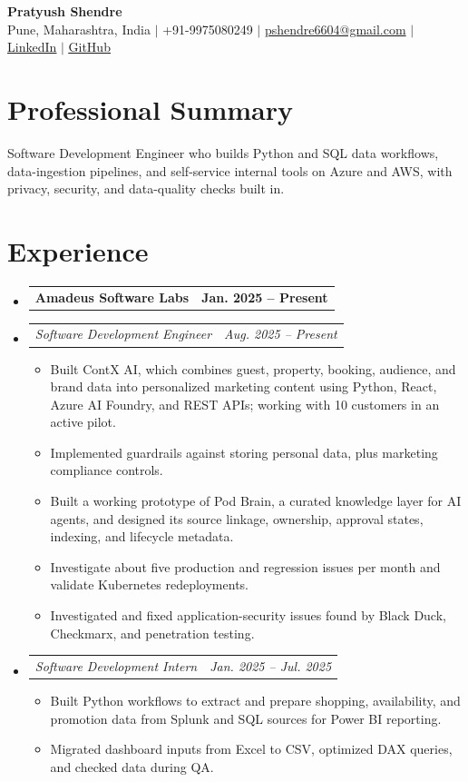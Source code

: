 \documentclass[a4paper,11pt]{article}
\makeatletter
\newcommand{\bulletpoint}[1]{\item\small{#1}}
\newcommand{\company}[2]{\item\begin{tabularx}{\textwidth}{@{}Xr@{}}\textbf{#1}& \textbf{#2}\end{tabularx}\vspace{-4pt}}
\newcommand{\role}[2]{\item\begin{tabularx}{\textwidth}{@{}Xr@{}}\textit{\small #1}&\textit{\small #2}\end{tabularx}\vspace{-5pt}}
\makeatother
\begin{document}
\begin{center}
  {\Large\bfseries Pratyush Shendre}\\[2pt]
  \small Pune, Maharashtra, India $|$ +91-9975080249 $|$
  \href{mailto:pshendre6604@gmail.com}{pshendre6604@gmail.com} $|$
  \href{https://www.linkedin.com/in/pratyush-shendre-2256a7223/}{\underline{LinkedIn}} $|$
  \href{https://github.com/PratyushS04}{\underline{GitHub}}
\end{center}

\section{Professional Summary}
\small Software Development Engineer who builds Python and SQL data workf{}lows, data-ingestion pipelines, and self-service internal tools on Azure and AWS, with privacy, security, and data-quality checks built in.

\section{Experience}
\begin{itemize}[leftmargin=0in,label={}]
  \company{Amadeus Software Labs}{Jan. 2025 -- Present}
  \role{Software Development Engineer}{Aug. 2025 -- Present}
  \begin{itemize}
    \bulletpoint{Built ContX AI, which combines guest, property, booking, audience, and brand data into personalized marketing content using Python, React, Azure AI Foundry, and REST APIs; working with 10 customers in an active pilot.}
    \bulletpoint{Implemented guardrails against storing personal data, plus marketing compliance controls.}
    \bulletpoint{Built a working prototype of Pod Brain, a curated knowledge layer for AI agents, and designed its source linkage, ownership, approval states, indexing, and lifecycle metadata.}
    \bulletpoint{Investigate about f{}ive production and regression issues per month and validate Kubernetes redeployments.}
    \bulletpoint{Investigated and f{}ixed application-security issues found by Black Duck, Checkmarx, and penetration testing.}
  \end{itemize}
  \role{Software Development Intern}{Jan. 2025 -- Jul. 2025}
  \begin{itemize}
    \bulletpoint{Built Python workf{}lows to extract and prepare shopping, availability, and promotion data from Splunk and SQL sources for Power BI reporting.}
    \bulletpoint{Migrated dashboard inputs from Excel to CSV, optimized DAX queries, and checked data during QA.}
  \end{itemize}
\end{itemize}
\end{document}
